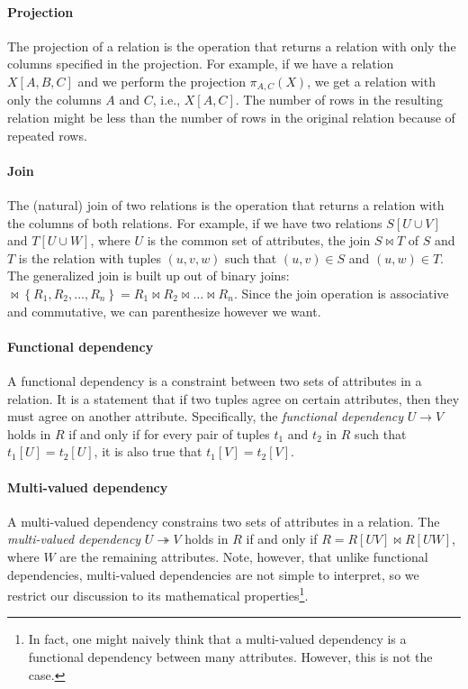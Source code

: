 \paragraph{Projection}  The projection of a relation is the operation that returns a
relation with only the columns specified in the projection.  For example, if we have a
relation $X[A, B, C]$ and we perform the projection $\pi_{A, C}(X)$, we get a
relation with only the columns $A$ and $C$, i.e., $X[A, C]$.  The number of rows
in the resulting relation might be less than the number of rows in the original relation
because of repeated rows.

\paragraph{Join}  The (natural) join of two relations is the operation that returns a
relation with the columns of both relations.  For example, if we have two relations $S[U
\cup V]$ and $T[U \cup W]$, where $U$ is the common set of attributes, the join $S \bowtie T$
of $S$ and $T$ is the relation with tuples $(u, v, w)$ such that $(u, v) \in S$ and $(u,
w) \in T$.  The generalized join is built up out of binary joins:  $\bowtie \left\{ R_1,
R_2, \dots, R_n \right\} = R_1 \bowtie R_2 \bowtie \dots \bowtie R_n$. Since the join
operation is associative and commutative, we can parenthesize however we want.

\paragraph{Functional dependency}  A functional dependency is a constraint between two
sets of attributes in a relation.  It is a statement that if two tuples agree on certain
attributes, then they must agree on another attribute.  Specifically, the \emph{functional
dependency} $U \to V$ holds in $R$ if and only if for every pair of tuples $t_1$ and $t_2$
in $R$ such that $t_1[U] = t_2[U]$, it is also true that $t_1[V] = t_2[V]$.

\paragraph{Multi-valued dependency}  A multi-valued dependency constrains
two sets of attributes in a relation.  The
\emph{multi-valued dependency} $U \twoheadrightarrow V$ holds in $R$ if and only if $R =
R[UV] \bowtie R[UW]$, where $W$ are the remaining attributes.  Note, however, that unlike
functional dependencies, multi-valued dependencies are not simple to interpret, so we
restrict our discussion to its mathematical properties\footnote{In fact, one might
naively think that a multi-valued dependency is a functional dependency between
many attributes.  However, this is not the case.}.

